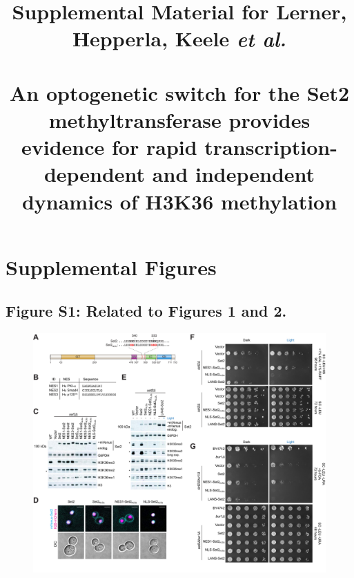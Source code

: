 \documentclass[11pt]{biorxiv}
\title{Supplemental Material for Lerner, Hepperla, Keele \emph{et al.} \\~\\ An optogenetic switch for the Set2 methyltransferase provides evidence for rapid transcription-dependent and independent dynamics of H3K36 methylation}
\author[1]{ }
\begin{document}
\maketitle
\author{}
\thispagestyle{empty}
\tableofcontents

\newpage

\setcounter{page}{1}

\section{Supplemental Figures}
\subsection{Figure S1: Related to Figures 1 and 2.}
\begin{figure}[ht!]
\center
\includegraphics[width=\textwidth, trim={0in 0in 0in 0in}, clip]{figures/FigS1_reduced2.pdf}
\end{figure}
\end{document}
